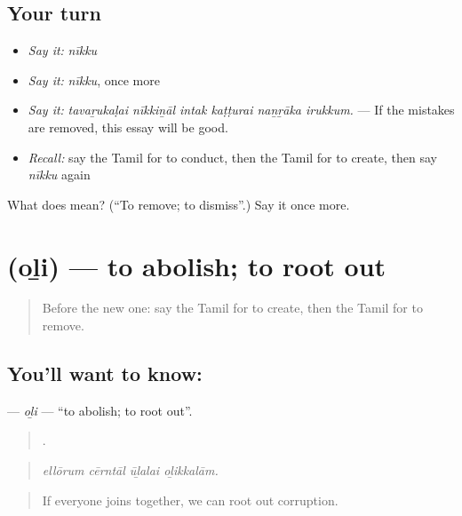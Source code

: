 \subsection*{Your turn}
\begin{itemize}
\raggedright
  \item \emph{Say it:} \emph{nīkku}
  \item \emph{Say it:} \emph{nīkku}, once more
  \item \emph{Say it:} \emph{tavaṟukaḷai nīkkiṉāl intak kaṭṭurai naṉṟāka irukkum.} — If the mistakes are removed, this essay will be good.
  \item \emph{Recall:} say the Tamil for to conduct, then the Tamil for to create, then say \emph{nīkku} again
\end{itemize}

\begin{tcolorbox}[breakable,colback=teal!4,colframe=teal!35!black,title={Before you move on}]
What does  mean? (\textquotedblleft{}To remove; to dismiss\textquotedblright{}.) Say it once more.
\end{tcolorbox}
\section[\texorpdfstring{\ta{ஒழி} (oḻi)}{ஒழி (oḻi)}]{ (oḻi) — to abolish; to root out}

\label{lesson:TA-C395-oli-abolish}



\begin{quote}
Before the new one: say the Tamil for to create, then the Tamil for to remove.
\end{quote}

\subsection*{You'll want to know: }
\textbf{} — \emph{oḻi} — \textquotedblleft{}to abolish; to root out\textquotedblright{}.

\begin{quote}
   .
\end{quote}

\begin{quote}
\emph{ellōrum cērntāl ūḻalai oḻikkalām.}
\end{quote}

\begin{quote}
If everyone joins together, we can root out corruption.
\end{quote}

